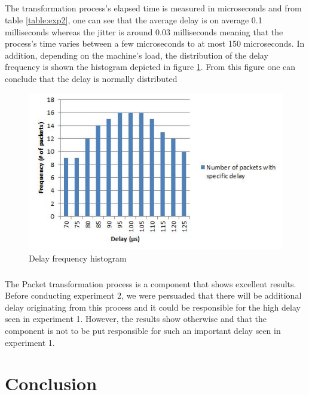 \documentclass[oneside,12pt,a4paper,final]{book}
\begin{document}
\paragraph{}
The transformation process's elapsed time is measured in microseconds and from table \ref{table:exp2}, one can see that the average delay is on average 0.1 milliseconds whereas the jitter is around 0.03 milliseconds meaning that the process's time varies between a few microseconds to at most 150 microseconds. In addition, depending on the machine's load, the distribution of the delay frequency is shown the histogram depicted in figure \ref{fig:histogram}. From this figure one can conclude that the delay is normally distributed
\begin{figure}[htbp]
 \centering
 \includegraphics[scale=0.9]{img/histogram.JPG}
 \caption{Delay frequency histogram}
 \label{fig:histogram}
 \end{figure}
\paragraph{}
 The Packet transformation process is a component that shows excellent results. Before conducting experiment 2, we were persuaded that there will be additional delay originating from this process and it could be responsible for the high delay seen in experiment 1. However, the results show otherwise and that the component is not to be put responsible for such an important delay seen in experiment 1.

\chapter{Conclusion}
\end{document}
